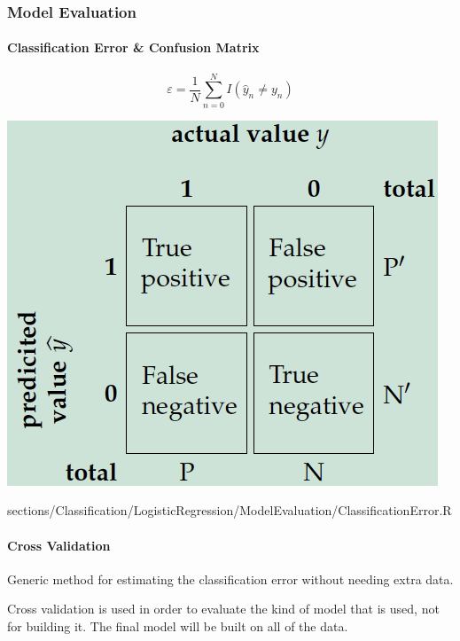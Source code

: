 \subsubsection{Model Evaluation}
	\paragraph{Classification Error & Confusion Matrix}
		\RTheory
		{
			$$\varepsilon = \frac{1}{N}\sum\limits_{n = 0}^N I(\hat{y}_n \neq y_n)$$
			
			\vspace{0pt}
			
			\includegraphics[scale=0.5]{images/ConfusionMatrix.png}
		}
		{
			sections/Classification/LogisticRegression/ModelEvaluation/ClassificationError.R
		}
		
	\paragraph{Cross Validation}
		Generic method for estimating the classification error without needing extra data.
		
		Cross validation is used in order to evaluate the kind of model that is used, not for building it.	 The final model will be built on all of the data.
		 
